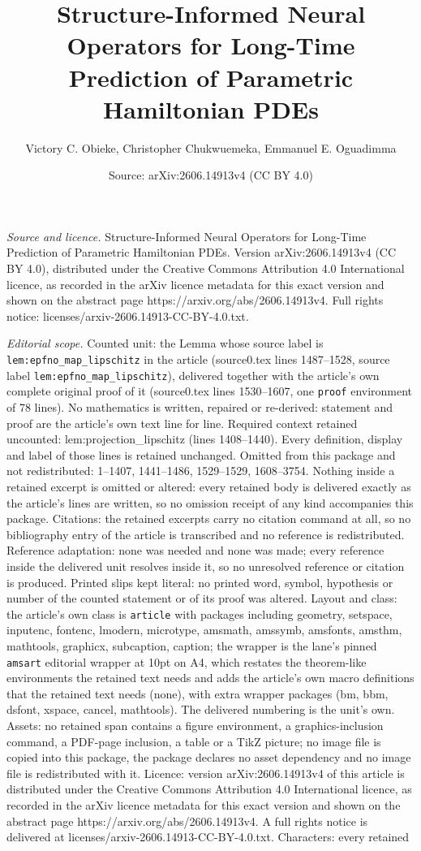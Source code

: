 \documentclass[10pt,a4paper]{amsart}
\title[Structure-Informed Neural Operators for Long-Time Prediction]{Structure-Informed Neural Operators for Long-Time Prediction of Parametric Hamiltonian PDEs}
\author{Victory C. Obieke, Christopher Chukwuemeka, Emmanuel E. Oguadimma}
\date{Source: arXiv:2606.14913v4 (CC BY 4.0)}
\begin{document}
\maketitle

\noindent\emph{Source and licence.} Structure-Informed Neural Operators for Long-Time Prediction of Parametric Hamiltonian PDEs. Version arXiv:2606.14913v4 (CC BY 4.0), distributed under the Creative Commons Attribution 4.0 International licence, as recorded in the arXiv licence metadata for this exact version and shown on the abstract page https://arxiv.org/abs/2606.14913v4. Full rights notice: licenses/arxiv-2606.14913-CC-BY-4.0.txt.\par\smallskip

\noindent\textit{Editorial scope.} Counted unit: the Lemma whose source label is \texttt{lem:epfno\_map\_lipschitz} in the article (source0.tex lines 1487--1528, source label \texttt{lem:epfno\_map\_lipschitz}), delivered together with the article's own complete original proof of it (source0.tex lines 1530--1607, one \texttt{proof} environment of 78 lines). No mathematics is written, repaired or re-derived: statement and proof are the article's own text line for line. Required context retained uncounted: lem:projection\_lipschitz (lines 1408--1440). Every definition, display and label of those lines is retained unchanged. Omitted from this package and not redistributed: 1--1407, 1441--1486, 1529--1529, 1608--3754. Nothing inside a retained excerpt is omitted or altered: every retained body is delivered exactly as the article's lines are written, so no omission receipt of any kind accompanies this package. Citations: the retained excerpts carry no citation command at all, so no bibliography entry of the article is transcribed and no reference is redistributed. Reference adaptation: none was needed and none was made; every reference inside the delivered unit resolves inside it, so no unresolved reference or citation is produced. Printed slips kept literal: no printed word, symbol, hypothesis or number of the counted statement or of its proof was altered. Layout and class: the article's own class is \texttt{article} with packages including geometry, setspace, inputenc, fontenc, lmodern, microtype, amsmath, amssymb, amsfonts, amsthm, mathtools, graphicx, subcaption, caption; the wrapper is the lane's pinned \texttt{amsart} editorial wrapper at 10pt on A4, which restates the theorem-like environments the retained text needs and adds the article's own macro definitions that the retained text needs (none), with extra wrapper packages (bm, bbm, dsfont, xspace, cancel, mathtools). The delivered numbering is the unit's own. Assets: no retained span contains a figure environment, a graphics-inclusion command, a PDF-page inclusion, a table or a TikZ picture; no image file is copied into this package, the package declares no asset dependency and no image file is redistributed with it. Licence: version arXiv:2606.14913v4 of this article is distributed under the Creative Commons Attribution 4.0 International licence, as recorded in the arXiv licence metadata for this exact version and shown on the abstract page https://arxiv.org/abs/2606.14913v4. A full rights notice is delivered at licenses/arxiv-2606.14913-CC-BY-4.0.txt. Characters: every retained 
\end{document}
